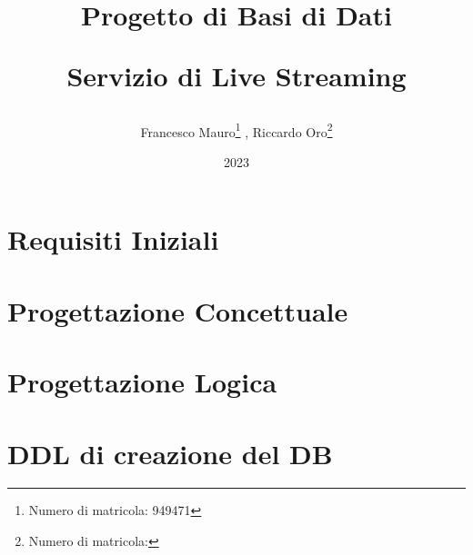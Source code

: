 \documentclass[letterpaper]{report}
\title{ Progetto di Basi di Dati \newline \begin{center}
  \textbf{Servizio di Live Streaming}
\end{center}}
\author{Francesco Mauro\footnote{Numero di matricola: 949471} , Riccardo Oro\footnote{Numero di matricola: }}
\date{2023}
\begin{document}
\maketitle
\tableofcontents

\chapter{Requisiti Iniziali}

\chapter{Progettazione Concettuale}




\chapter{Progettazione Logica}



\chapter{DDL di creazione del DB}

\end{document}
